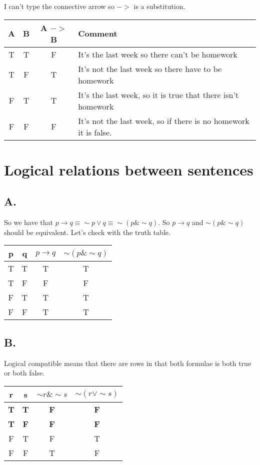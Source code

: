 \documentclass{article}
\begin{document}
I can't type the connective arrow so $->$ is a substitution. 

\begin{tabular}{cc|cl}
A & B & A $->$ B & Comment\\
\hline 
T & T & F & It's the last week so there can't be homework  \\
T & F & T & It's not the last week so there have to be homework\\
F & T & T & It's the last week, so it is true that there isn't homework\\
F & F & F & It's not the last week, so if there is no homework it is false. \\
\end{tabular}

\section{Logical relations between sentences}

\subsection*{A.}
So we have that $p \rightarrow q \equiv \sim p \lor q \equiv \sim (p \& \sim q)$. So $p \rightarrow q$ and $\sim (p \& \sim q)$ should be equivalent. Let's check with the truth table.

\begin{tabular}{cc|cc}
p & q & $p \rightarrow q$ & $\sim (p \& \sim q)$ \\ \hline 
T & T & T & T \\
T & F & F & F \\
F & T & T & T \\
F & F & T & T \\
\end{tabular}

\subsection*{B.}
Logical compatible means that there are rows in that both formulae is both true or both false.

\begin{tabular}{cc|cc}
r & s & $\sim r \& \sim s$ & $\sim (r \lor \sim s)$ \\ \hline 
\textbf{T} & \textbf{T} & \textbf{F} & \textbf{F} \\
\textbf{T} & \textbf{F} & \textbf{F} & \textbf{F} \\
F & T & F & T \\
F & F & T & F \\
\end{tabular}
\end{document}

